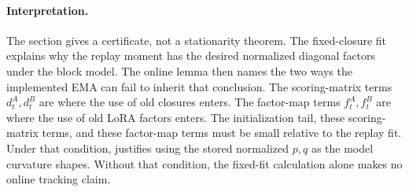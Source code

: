 \paragraph{Interpretation.}
The section gives a certificate, not a stationarity theorem. The fixed-closure
fit explains why the replay moment has the desired normalized diagonal factors
under the block model. The online lemma then names the two ways the implemented
EMA can fail to inherit that conclusion. The scoring-matrix terms
$d^A_t,d^B_t$ are where the use of old closures enters. The factor-map terms
$f^A_t,f^B_t$ are where the use of old LoRA factors enters. The initialization
tail, these scoring-matrix terms, and these factor-map terms must be small
relative to the replay fit. Under that condition,
 justifies using the stored normalized $p,q$ as
the model curvature shapes. Without that condition, the fixed-fit calculation
alone makes no online tracking claim.
